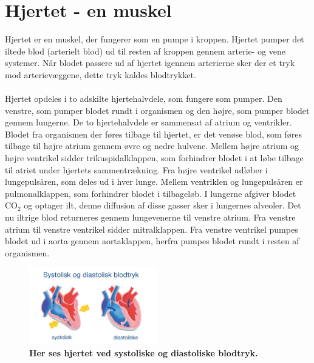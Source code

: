 \chapter{Hjertet - en muskel}
Hjertet er en muskel, der fungerer som en pumpe i kroppen. Hjertet pumper det iltede blod (arterielt blod) ud til resten af kroppen gennem arterie- og vene systemer. Når blodet passere ud af hjertet igennem arterierne sker der et tryk mod arterievæggene, dette tryk kaldes blodtrykket. \\\\
Hjertet opdeles i to adskilte hjertehalvdele, som fungere som pumper. Den venstre, som pumper blodet rundt i organismen og den højre, som pumper blodet gennem lungerne. De to hjertehalvdele er sammensat af atrium og ventrikler. Blodet fra organismen der føres tilbage til hjertet, er det venøse blod, som føres tilbage til højre atrium gennem øvre og nedre hulvene. Mellem højre atrium og højre ventrikel sidder trikuspidalklappen, som forhindrer blodet i at løbe tilbage til atriet under hjertets sammentrækning. Fra højre ventrikel udløber i lungepulsåren, som deles ud i hver lunge. Mellem ventriklen og lungepulsåren er pulmonalklappen, som forhindrer blodet i tilbageløb. I lungerne afgiver blodet CO$_{2}$ og optager ilt, denne diffusion af disse gasser sker i lungernes alveoler. Det nu iltrige blod returneres gennem lungevenerne til venstre atrium. Fra venstre atrium til venstre ventrikel sidder mitralklappen. Fra venstre ventrikel pumpes blodet ud i aorta gennem aortaklappen, herfra pumpes blodet rundt i resten af organismen. \cite{hjertedsd}
\begin{figure}[H]
\includegraphics[width =0.5\textwidth , center]{billeder/sysdia}
\caption{\textbf{Her ses hjertet ved systoliske og diastoliske blodtryk.}}
\end{figure}
